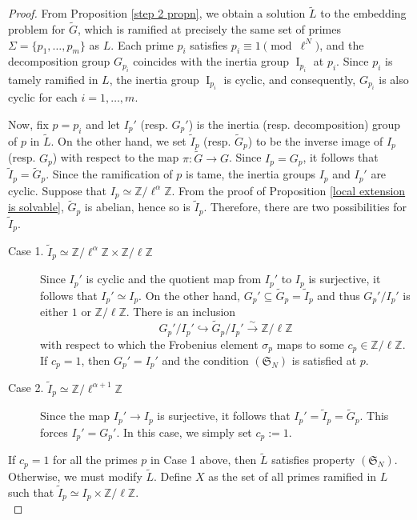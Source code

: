 \documentclass[10pt,a4paper]{amsart}
\newcommand{\Z}{\mathbb{Z}}
\begin{document}
\begin{proof}
From Proposition \ref{step 2 propn}, we obtain a solution \(\widetilde{L}\) to the embedding problem for \(\widetilde{G}\), which is ramified at precisely the same set of primes \(\Sigma = \{p_1, \dots, p_m\}\) as \(L\). Each prime \(p_i\) satisfies \(p_i \equiv 1 \pmod{\ell^N}\), and the decomposition group \(G_{p_i}\) coincides with the inertia group \(\operatorname{I}_{p_i}\) at \(p_i\). Since \(p_i\) is tamely ramified in \(L\), the inertia group \(\operatorname{I}_{p_i}\) is cyclic, and consequently, \(G_{p_i}\) is also cyclic for each \(i = 1, \dots, m\).

Now, fix \(p = p_i\) and let $I_p'$ (resp. $G_p'$) is the inertia (resp. decomposition) group of $p$ in $\widetilde{L}$. On the other hand, we set $\widetilde{I}_p$ (resp. $\widetilde{G}_p$) to be the inverse image of $I_p$ (resp. $G_p$) with respect to the map $\pi: \widetilde{G}\rightarrow G$. Since $I_p=G_p$, it follows that $\widetilde{I}_p=\widetilde{G}_p$. Since the ramification of $p$ is tame, the inertia groups $I_p$ and $I_p'$ are cyclic. Suppose that \(I_p \simeq \mathbb{Z}/\ell^\alpha\mathbb{Z}\). From the proof of Proposition \ref{local extension is solvable}, $\widetilde{G}_p$ is abelian, hence so is $\widetilde{I}_p$. Therefore, there are two possibilities for \(\widetilde{I}_p\).
\begin{description}
    \item[Case 1. \(\widetilde{I}_p \simeq \mathbb{Z}/\ell^\alpha\mathbb{Z} \times \mathbb{Z}/\ell\mathbb{Z}\)] Since $I_p'$ is cyclic and the quotient map from $I_p'$ to $I_p$ is surjective, it follows that $I_p'\simeq I_p$. On the other hand, $G_p'\subseteq \widetilde{G}_p=\widetilde{I}_p$ and thus $G_p'/I_p'$ is either $1$ or $\Z/\ell \Z$. There is an inclusion
    \[G_p'/I_p'\hookrightarrow \widetilde{G}_p/I_p'\xrightarrow{\sim} \Z/\ell \Z\] with respect to which the Frobenius element \(\sigma_p\) maps to some \(c_p \in \mathbb{Z}/\ell\mathbb{Z}\). If \(c_p = 1\), then \(G_p' = I_p'\) and the condition \((\mathfrak{S}_N)\) is satisfied at \(p\). 
    \item[Case 2. \(\widetilde{I}_p \simeq \mathbb{Z}/\ell^{\alpha+1}\mathbb{Z}\)] Since the map $I_p'\rightarrow I_p$ is surjective, it follows that $I_p'=\widetilde{I}_p=\widetilde{G}_p$. This forces $I_p'=G_p'$. In this case, we simply set $c_p:=1$.
\end{description}
If \(c_p = 1\) for all the primes $p$ in Case 1 above, then \(\widetilde{L}\) satisfies property \((\mathfrak{S}_N)\). Otherwise, we must modify \(\widetilde{L}\). Define $X$ as the set of all primes ramified in \(L\) such that $\widetilde{I}_p\simeq I_p\times \Z/\ell \Z$. \\


\end{proof}
\end{document}
